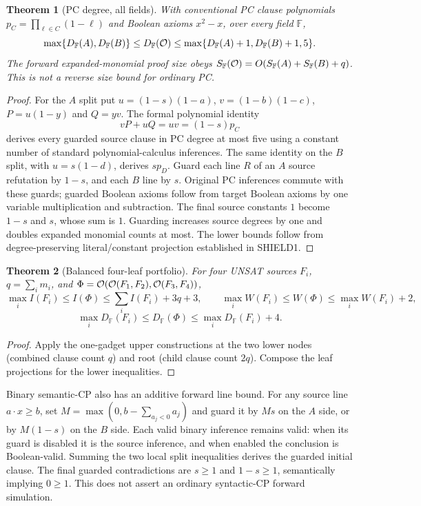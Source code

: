 \documentclass{article}
\newtheorem{theorem}{Theorem}
\begin{document}
\begin{theorem}[PC degree, all fields]
With conventional PC clause polynomials $p_C=\prod_{\ell\in C}(1-\ell)$ and Boolean axioms $x^2-x$, over every field $\mathbb F$,
\[
\max\{D_{\mathbb F}(A),D_{\mathbb F}(B)\}
\le D_{\mathbb F}({\cal O})
\le\max\{D_{\mathbb F}(A)+1,D_{\mathbb F}(B)+1,5\}.
\]
The forward expanded-monomial proof size obeys $S_{\mathbb F}({\cal O})=O(S_{\mathbb F}(A)+S_{\mathbb F}(B)+q)$. This is not a reverse size bound for ordinary PC.
\end{theorem}
\begin{proof}
For the $A$ split put $u=(1-s)(1-a)$, $v=(1-b)(1-c)$, $P=u(1-y)$ and $Q=yv$. The formal polynomial identity
\[
\boxed{vP+uQ=uv=(1-s)p_C}
\]
derives every guarded source clause in PC degree at most five using a constant number of standard polynomial-calculus inferences. The same identity on the $B$ split, with $u=s(1-d)$, derives $sp_D$. Guard each line $R$ of an $A$ source refutation by $1-s$, and each $B$ line by $s$. Original PC inferences commute with these guards; guarded Boolean axioms follow from target Boolean axioms by one variable multiplication and subtraction. The final source constants $1$ become $1-s$ and $s$, whose sum is $1$. Guarding increases source degrees by one and doubles expanded monomial counts at most. The lower bounds follow from degree-preserving literal/constant projection established in SHIELD1.
\end{proof}

\begin{theorem}[Balanced four-leaf portfolio]
For four UNSAT sources $F_i$, $q=\sum_i m_i$, and $\Phi={\cal O}({\cal O}(F_1,F_2),{\cal O}(F_3,F_4))$,
\[
\max_i I(F_i)\le I(\Phi)\le \sum_i I(F_i)+3q+3,\qquad
\max_i W(F_i)\le W(\Phi)\le\max_i W(F_i)+2,
\]
\[
\boxed{\max_i D_{\mathbb F}(F_i)\le D_{\mathbb F}(\Phi)\le\max_i D_{\mathbb F}(F_i)+4}.
\]
\end{theorem}
\begin{proof}
Apply the one-gadget upper constructions at the two lower nodes (combined clause count $q$) and root (child clause count $2q$). Compose the leaf projections for the lower inequalities.
\end{proof}

\noindent Binary semantic-CP also has an additive forward line bound. For any source line $a\cdot x\ge b$, set $M=\max(0,b-\sum_{a_j<0}a_j)$ and guard it by $Ms$ on the $A$ side, or by $M(1-s)$ on the $B$ side. Each valid binary inference remains valid: when its guard is disabled it is the source inference, and when enabled the conclusion is Boolean-valid. Summing the two local split inequalities derives the guarded initial clause. The final guarded contradictions are $s\ge1$ and $1-s\ge1$, semantically implying $0\ge1$. This does not assert an ordinary syntactic-CP forward simulation.
\end{document}
